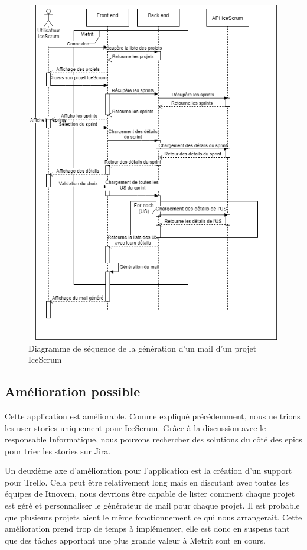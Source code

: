 \documentclass[12pt, twoside, openright]{report}
\begin{document}
\begin{figure}[h]
\centering
\includegraphics[width=15cm,height=15cm]{img/Diagramme-de-sequence.png}
\caption{Diagramme de séquence de la génération d'un mail d'un projet IceScrum}
\end{figure}

\subsection{Amélioration possible}

Cette application est améliorable. Comme expliqué précédemment, nous ne trions les user stories uniquement pour IceScrum. Grâce à la discussion avec le responsable Informatique, nous pouvons rechercher des solutions du côté des epics pour trier les stories sur Jira. 

Un deuxième axe d'amélioration pour l'application est la création d'un support pour Trello. Cela peut être relativement long mais en discutant avec toutes les équipes de Itnovem, nous devrions être capable de lister comment chaque projet est géré et personnaliser le générateur de mail pour chaque projet. Il est probable que plusieurs projets aient le même fonctionnement ce qui nous arrangerait. Cette amélioration prend trop de temps à implémenter, elle est donc en suspens tant que des tâches apportant une plus grande valeur à Metrit sont en cours.
\end{document}
